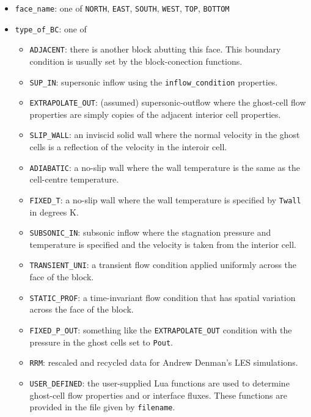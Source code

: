 \documentclass[12pt,a4paper,twoside]{article}
\begin{document}
\begin{itemize}
  \item \texttt{face\_name}: one of \texttt{NORTH}, \texttt{EAST},
    \texttt{SOUTH}, \texttt{WEST}, \texttt{TOP}, \texttt{BOTTOM}
  \item \texttt{type\_of\_BC}: one of 
    \begin{itemize}
      \item \texttt{ADJACENT}: there is another block abutting this face.
        This boundary condition is usually set by the block-conection functions.
      \item \texttt{SUP\_IN}: supersonic inflow using the
        \texttt{inflow\_condition} properties.
      \item \texttt{EXTRAPOLATE\_OUT}: (assumed) supersonic-outflow where the
        ghost-cell flow properties are simply copies of the adjacent interior 
        cell properties.
      \item \texttt{SLIP\_WALL}: an inviscid solid wall where the normal
        velocity in the ghost cells is a reflection of the velocity in the
        interoir cell.
      \item \texttt{ADIABATIC}: a no-slip wall where the wall temperature is
        the same as the cell-centre temperature.
      \item \texttt{FIXED\_T}: a no-slip wall where the wall temperature is
        specified by \texttt{Twall} in degrees K.
      \item \texttt{SUBSONIC\_IN}: subsonic inflow where the stagnation
        pressure and temperature is specified and the velocity is taken from
        the interior cell.
      \item \texttt{TRANSIENT\_UNI}: a transient flow condition applied
        uniformly across the face of the block.
      \item \texttt{STATIC\_PROF}: a time-invariant flow condition that has
        spatial variation across the face of the block.
      \item \texttt{FIXED\_P\_OUT}: something like the \texttt{EXTRAPOLATE\_OUT}
        condition with the pressure in the ghost cells set to \texttt{Pout}.
      \item \texttt{RRM}: rescaled and recycled data for Andrew Denman's LES simulations.
      \item \texttt{USER\_DEFINED}: the user-supplied Lua functions are used to
        determine ghost-cell flow properties and or interface fluxes.
        These functions are provided in the file given by \texttt{filename}.

\end{itemize}
\end{itemize}
\end{document}

